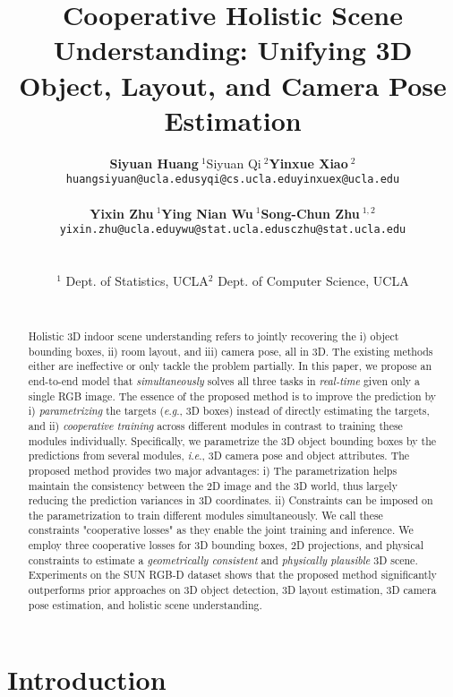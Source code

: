 \documentclass{article}
\title{Cooperative Holistic Scene Understanding: Unifying 3D Object, Layout, and Camera Pose Estimation}
\author{
\begin{tabular}{c c c}
\bf Siyuan Huang$~^{1}$\quad\quad & Siyuan Qi$~^{2}$\quad\quad & \bf Yinxue Xiao$~^{2}$\quad\quad\\
\texttt{huangsiyuan@ucla.edu}\quad\quad & \texttt{syqi@cs.ucla.edu}\quad\quad & \texttt{yinxuex@ucla.edu}\\
\vspace{6pt}\\
\bf Yixin Zhu$~^{1}$\quad\quad & \bf Ying Nian Wu$~^{1}$\quad\quad & \bf Song-Chun Zhu$~^{1,2}$\\
\texttt{yixin.zhu@ucla.edu}\quad\quad & \texttt{ywu@stat.ucla.edu}\quad\quad & \texttt{sczhu@stat.ucla.edu}
\end{tabular}
\vspace{6pt}\\
\begin{tabular}{c c c}
$^1$ Dept. of Statistics, UCLA  & $^2$ Dept. of Computer Science, UCLA 
\end{tabular}\\
}
\makeatletter
\newcommand{\ie}{\textit{i}.\textit{e}.\@\xspace}
\newcommand{\eg}{\textit{e}.\textit{g}.\@\xspace}
\makeatother
\begin{document}
\maketitle


\begin{abstract}
Holistic 3D indoor scene understanding refers to jointly recovering the i) object bounding boxes, ii) room layout, and iii) camera pose, all in 3D. The existing methods either are ineffective or only tackle the problem partially. In this paper, we propose an end-to-end model that \emph{simultaneously} solves all three tasks in \emph{real-time} given only a single RGB image. The essence of the proposed method is to improve the prediction by i) \emph{parametrizing} the targets (\eg, 3D boxes) instead of directly estimating the targets, and ii) \emph{cooperative training} across different modules in contrast to training these modules individually. Specifically, we parametrize the 3D object bounding boxes by the predictions from several modules, \ie, 3D camera pose and object attributes. The proposed method provides two major advantages: i) The parametrization helps maintain the consistency between the 2D image and the 3D world, thus largely reducing the prediction variances in 3D coordinates. ii) Constraints can be imposed on the parametrization to train different modules simultaneously. We call these constraints "cooperative losses" as they enable the joint training and inference. We employ three cooperative losses for 3D bounding boxes, 2D projections, and physical constraints to estimate a \emph{geometrically consistent} and \emph{physically plausible} 3D scene. Experiments on the SUN RGB-D dataset shows that the proposed method significantly outperforms prior approaches on 3D object detection, 3D layout estimation, 3D camera pose estimation, and holistic scene understanding.
\end{abstract}

\section{Introduction}
\end{document}
